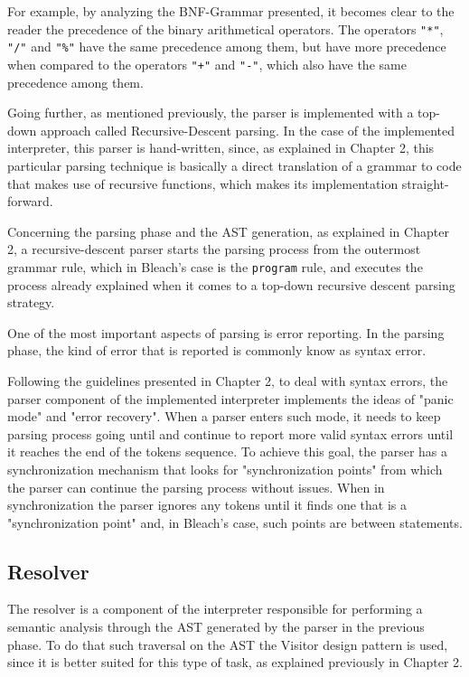For example, by analyzing the BNF-Grammar presented, it becomes clear to the reader the precedence of the binary arithmetical operators. The operators \texttt{"*"}, \texttt{"/"} and \texttt{"\%"} have the same precedence among them, but have more precedence when compared to the operators \texttt{"+"} and \texttt{"-"}, which also have the same precedence among them.

Going further, as mentioned previously, the parser is implemented with a top-down approach called Recursive-Descent parsing. In the case of the implemented interpreter, this parser is hand-written, since, as explained in Chapter 2, this particular parsing technique is basically a direct translation of a grammar to code that makes use of recursive functions, which makes its implementation straight-forward.

Concerning the parsing phase and the AST generation, as explained in Chapter 2, a recursive-descent parser starts the parsing process from the outermost grammar rule, which in Bleach's case is the \texttt{program} rule, and executes the process already explained when it comes to a top-down recursive descent parsing strategy.

One of the most important aspects of parsing is error reporting. In the parsing phase, the kind of error that is reported is commonly know as syntax error.

Following the guidelines presented in Chapter 2, to deal with syntax errors, the parser component of the implemented interpreter implements the ideas of "panic mode" and "error recovery". When a parser enters such mode, it needs to keep parsing process going until and continue to report more valid syntax errors until it reaches the end of the tokens sequence. To achieve this goal, the parser has a synchronization mechanism that looks for "synchronization points" from which the parser can continue the parsing process without issues. When in synchronization the parser ignores any tokens until it finds one that is a "synchronization point" and, in Bleach's case, such points are between statements.

\subsection{Resolver}
The resolver is a component of the interpreter responsible for performing a semantic analysis through the AST generated by the parser in the previous phase. To do that such traversal on the AST the Visitor design pattern is used, since it is better suited for this type of task, as explained previously in Chapter 2. 

